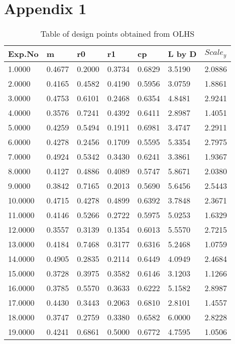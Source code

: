 \appendix
\chapter*{Appendix 1}
\begin{longtable}{ p{}  p{}  p{}  p{}  p{} p{}  p{} }
	
\caption{Table of design points obtained from OLHS}
\label{Table of design points obtained from OLHS}
\\
\hline
Exp.No	&	m	&	r0	&	r1	&	cp	&	L by D	&	$ Scale_y $	\\
\hline 
1.0000	&	0.4677	&	0.2000	&	0.3734	&	0.6829	&	3.5190	&	2.0886	\\
2.0000	&	0.4165	&	0.4582	&	0.4190	&	0.5956	&	3.0759	&	1.8861	\\
3.0000	&	0.4753	&	0.6101	&	0.2468	&	0.6354	&	4.8481	&	2.9241	\\
4.0000	&	0.3576	&	0.7241	&	0.4392	&	0.6411	&	2.8987	&	1.4051	\\
5.0000	&	0.4259	&	0.5494	&	0.1911	&	0.6981	&	3.4747	&	2.2911	\\
6.0000	&	0.4278	&	0.2456	&	0.1709	&	0.5595	&	5.3354	&	2.7975	\\
7.0000	&	0.4924	&	0.5342	&	0.3430	&	0.6241	&	3.3861	&	1.9367	\\
8.0000	&	0.4127	&	0.4886	&	0.4089	&	0.5747	&	5.8671	&	2.0380	\\
9.0000	&	0.3842	&	0.7165	&	0.2013	&	0.5690	&	5.6456	&	2.5443	\\
10.0000	&	0.4715	&	0.4278	&	0.4899	&	0.6392	&	3.7848	&	2.3671	\\
11.0000	&	0.4146	&	0.5266	&	0.2722	&	0.5975	&	5.0253	&	1.6329	\\
12.0000	&	0.3557	&	0.3139	&	0.1354	&	0.6013	&	5.5570	&	2.7215	\\
13.0000	&	0.4184	&	0.7468	&	0.3177	&	0.6316	&	5.2468	&	1.0759	\\
14.0000	&	0.4905	&	0.2835	&	0.2114	&	0.6449	&	4.0949	&	2.4684	\\
15.0000	&	0.3728	&	0.3975	&	0.3582	&	0.6146	&	3.1203	&	1.1266	\\
16.0000	&	0.3785	&	0.5570	&	0.3633	&	0.6222	&	5.1582	&	2.8987	\\
17.0000	&	0.4430	&	0.3443	&	0.2063	&	0.6810	&	2.8101	&	1.4557	\\
18.0000	&	0.3747	&	0.2759	&	0.3380	&	0.6582	&	6.0000	&	2.8228	\\
19.0000	&	0.4241	&	0.6861	&	0.5000	&	0.6772	&	4.7595	&	1.0506	\\

\end{longtable}

